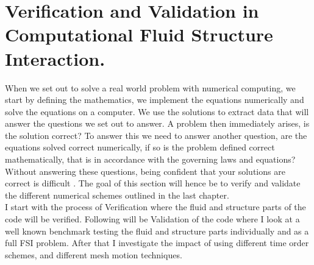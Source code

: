 \chapter{Verification and Validation in Computational Fluid Structure Interaction. }
When we set out to solve a real world problem with numerical computing, we start by defining the mathematics, we implement the equations numerically and solve the equations on a computer. We use the solutions to extract data that will answer the questions we set out to answer. A problem then immediately arises, is the solution correct? To answer this we need to answer another question, are the equations solved correct numerically, if so is the problem defined correct mathematically, that is in accordance with the governing laws and equations?
Without answering these questions, being confident that your solutions are correct is difficult \cite{Selin2014}. The goal of this section will hence be to verify and validate the different numerical schemes outlined in the last chapter.  \\

I start with the process of Verification where the fluid and structure parts of the code will be verified. Following will be Validation of the code where I look at a well known benchmark testing the fluid and structure parts individually and as a full FSI problem. After that I investigate the impact of using different time order schemes, and different mesh motion techniques.\newline

\begin{comment}
We start with Verification, which is the process of assessing numerical correctness and accuracy of a computed solution. Then comes Validation, which is assessing physical accuracy of the numerical model, a process which is done by comparing numerical simulation with experimental data. In simple terms we check that we are solving the equations right and then that we are solving the right equations. The process of Verification has to always come before Validation. Because there is no need in checking if we are using the right equations if the equations are not solved right. 
\end{comment}

